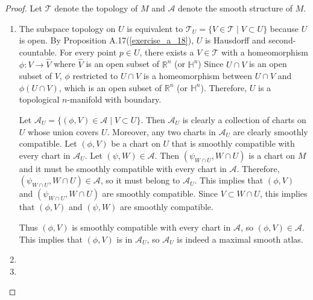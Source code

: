 \begin{proof}
  Let $\mathcal{T}$ denote the topology of $M$ and $\mathcal{A}$ denote the smooth structure of $M$.
  \begin{enumerate}[label=(\alph*)]
    \item
      The subspace topology on $U$ is equivalent to $\mathcal{T}_U = \{ V \in \mathcal{T} \mid V \subset U \}$ because $U$ is open.
      By Proposition A.17(\ref{exercise_a_18}), $U$ is Hausdorff and second-countable.
      For every point $p \in U$, there exists a $V \in \mathcal{T}$ with a homeomorphism $\phi: V \rightarrow \hat{V}$ where $\hat{V}$ is an open subset of $\mathbb{R}^n$ (or $\mathbb{H}^n$)
      Since $U \cap V$ is an open subset of $V$, $\phi$ restricted to $U \cap V$ is a homeomorphism between $U \cap V$ and $\phi(U \cap V)$, which is an open subset of $\mathbb{R}^n$ (or $\mathbb{H}^n$).
      Therefore, $U$ is a topological $n$-manifold with boundary.

      Let $\mathcal{A}_U = \{ (\phi, V) \in \mathcal{A} \mid V \subset U \}$.
      Then $\mathcal{A}_U$ is clearly a collection of charts on $U$ whose union covers $U$.
      Moreover, any two charts in $\mathcal{A}_U$ are clearly smoothly compatible.
      Let $(\phi, V)$ be a chart on $U$ that is smoothly compatible with every chart in $\mathcal{A}_U$.
      Let $(\psi, W) \in \mathcal{A}$.
      Then $(\psi_{W \cap U}, W \cap U)$ is a chart on $M$ and it must be smoothly compatible with every chart in $\mathcal{A}$.
      Therefore, $(\psi_{W \cap U}, W \cap U) \in \mathcal{A}$, so it must belong to $\mathcal{A}_U$.
      This implies that $(\phi, V)$ and $(\psi_{W \cap U}, W \cap U)$ are smoothly compatible.
      Since $V \subset W \cap U$, this implies that $(\phi, V)$ and $(\psi, W)$ are smoothly compatible.

      Thus $(\phi, V)$ is smoothly compatible with every chart in $\mathcal{A}$, so $(\phi, V) \in \mathcal{A}$.
      This implies that $(\phi, V)$ is in $\mathcal{A}_U$, so $\mathcal{A}_U$ is indeed a maximal smooth atlas.
    \item
    \item
  \end{enumerate}
\end{proof}
